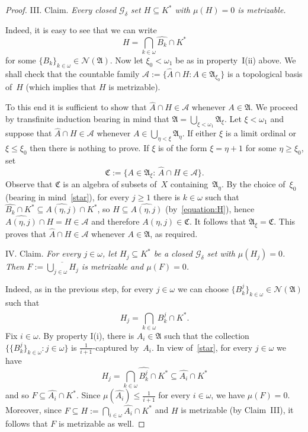 \documentclass[12pt]{amsart}
\newcommand{\sub}{\subseteq}
\newcommand{\alg}{\mathfrak A}
\newcommand{\algc}{\mathfrak C}
\newcommand{\NN}{{\mathcal N}}
\newcommand{\0}{\protect{\bf 0}}
\newcommand{\1}{\protect{\bf 1}}
\theoremstyle{definition}
\theoremstyle{remark}
\numberwithin{equation}{section}
\begin{document}
\begin{proof}
\smallskip
{\sc III. Claim.} {\em Every closed $\mathcal{G}_\delta$ set $H\sub K^*$ with $\mu(H)=0$ is metrizable.}

Indeed, it is easy to see that we can write 
\begin{equation}\label{equation:H}
	H=\bigcap_{k\in \omega} \widehat{B_k} \cap K^*
\end{equation}
for some $\{B_k\}_{k\in \omega}\in \NN(\alg)$. Now let $\xi_0<\omega_1$ be as in property~I(ii) above.
We shall check that the countable family $\mathcal{A}:=\{\widehat{A} \cap H: A\in\alg_{\xi_0}\}$ is a topological basis of~$H$
(which implies that $H$ is metrizable).

To this end it is sufficient to show that $\widehat{A} \cap H \in \mathcal{A}$ whenever $A \in \alg$. 
We proceed by transfinite induction bearing in mind that $\alg=\bigcup_{\xi <\omega_1}\alg_\xi$. Let $\xi < \omega_1$ and suppose 
that $\widehat{A} \cap H\in \mathcal{A}$ whenever $A \in \bigcup_{\eta < \xi}\alg_\eta$. If either $\xi$ is a limit ordinal
or $\xi \leq \xi_0$ then there is nothing to prove. 
If $\xi$ is of the form $\xi=\eta+1$ for some $\eta \geq \xi_0$, set 
$$
	\algc:=\{A\in \alg_\xi: \, \widehat{A} \cap H\in \mathcal{A}\}.
$$
Observe that $\algc$ is an algebra of subsets of~$X$ containing~$\alg_{\eta}$.
By the choice of~$\xi_0$ (bearing in mind~\eqref{star}), for every $j\ge 1$ there is $k\in \omega$ such that 
$\widehat{B_k} \cap K^* \sub \widehat{A(\eta,j)} \cap K^*$, so 
$H \sub \widehat{A(\eta,j)}$ (by~\eqref{equation:H}), hence $\widehat{A(\eta,j)} \cap H=H\in \mathcal{A}$ and therefore
$A(\eta,j) \in \algc$. It follows that $\alg_\xi=\algc$. 
This proves that $\widehat{A} \cap H \in \mathcal{A}$ whenever $A \in \alg$, as required. 

\smallskip
{\sc IV. Claim.}
{\em For every $j\in \omega$, let $H_j \sub K^*$ be a closed $\mathcal{G}_\delta$
set with $\mu(H_j)=0$. Then $F:=\overline{\bigcup_{j\in \omega} H_j}$ 
is metrizable and $\mu(F)=0$.}

Indeed, as in the previous step, for every $j\in \omega$ 
we can choose $\{B^j_k\}_{k\in \omega}\in \NN(\alg)$
such that
$$
	H_j=\bigcap_{k\in \omega} \widehat{B^j_k} \cap K^*.
$$
Fix $i\in\omega$.
By property I(i), there is $A_i\in \alg$ 
such that the collection $\{\{B^j_k\}_{k\in \omega}:j\in \omega\}$ is $\frac{1}{i+1}$-captured 
by~$A_i$. In view of~\eqref{star}, for every $j\in \omega$ we have 
$$
	H_j=\bigcap_{k\in \omega}\widehat{B^j_k}\cap K^* 
	\sub \widehat{A_i}\cap K^*
$$
and so $F\sub \widehat{A_i}\cap K^*$. Since $\mu(\widehat{A_i})\leq \frac{1}{i+1}$ 
for every $i\in \omega$, we have $\mu(F)=0$. Moreover, 
since $F \sub H:=\bigcap_{i\in \omega}\widehat{A_i}\cap K^*$ and $H$ is metrizable (by Claim~III), it
follows that $F$ is metrizable as well.



\end{proof}
\end{document}
